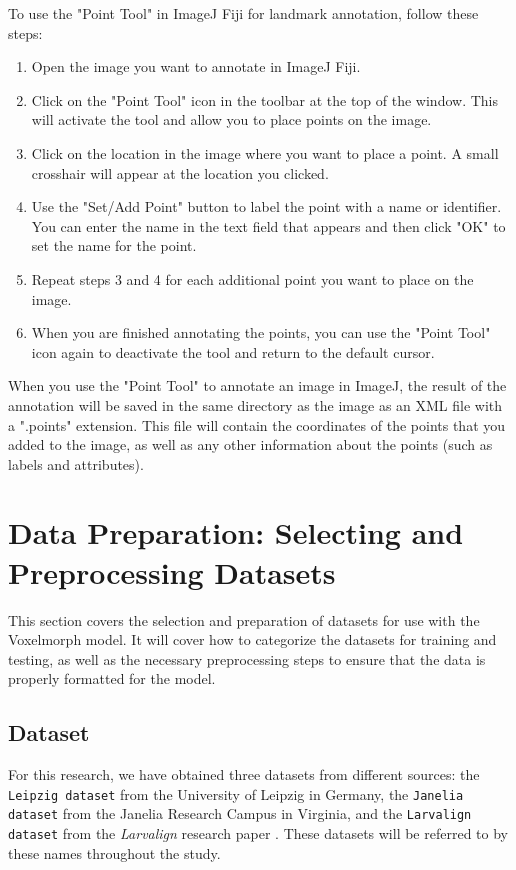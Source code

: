 \documentclass{report}
\begin{document}
	To use the "Point Tool" in ImageJ Fiji for landmark annotation, follow these steps:
	\begin{enumerate}
		\item Open the image you want to annotate in ImageJ Fiji.
		\item Click on the "Point Tool" icon in the toolbar at the top of the window. This will activate the tool and allow you to place points on the image.
		\item Click on the location in the image where you want to place a point. A small crosshair will appear at the location you clicked.
		\item Use the "Set/Add Point" button to label the point with a name or identifier. You can enter the name in the text field that appears and then click "OK" to set the name for the point.
		\item Repeat steps 3 and 4 for each additional point you want to place on the image.
		\item When you are finished annotating the points, you can use the "Point Tool" icon again to deactivate the tool and return to the default cursor.
	\end{enumerate}

	When you use the "Point Tool" to annotate an image in ImageJ, the result of the annotation will be saved in the same directory as the image as an XML file with a ".points" extension. This file will contain the coordinates of the points that you added to the image, as well as any other information about the points (such as labels and attributes).
	
	\section{Data Preparation: Selecting and Preprocessing Datasets}
	This section covers the selection and preparation of datasets for use with the Voxelmorph model. It will cover how to categorize the datasets for training and testing, as well as the necessary preprocessing steps to ensure that the data is properly formatted for the model.
	
	\subsection{Dataset}
	For this research, we have obtained three datasets from different sources: the \texttt{Leipzig dataset} from the University of Leipzig in Germany, the \texttt{Janelia dataset} from the Janelia Research Campus in Virginia, and the \texttt{Larvalign dataset} from the \textit{Larvalign} research paper \cite{larvalign}. These datasets will be referred to by these names throughout the study.
	
\end{document}
